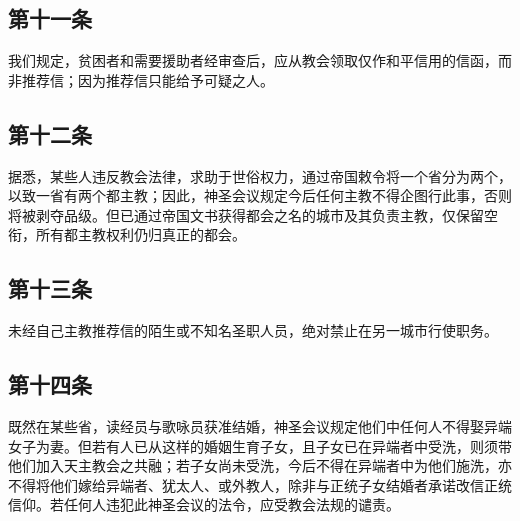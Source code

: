 
\subsection{第十一条}

我们规定，贫困者和需要援助者经审查后，应从教会领取仅作和平信用的信函，而非推荐信；因为推荐信只能给予可疑之人。\par


\subsection{第十二条}

据悉，某些人违反教会法律，求助于世俗权力，通过帝国敕令将一个省分为两个，以致一省有两个都主教；因此，神圣会议规定今后任何主教不得企图行此事，否则将被剥夺品级。但已通过帝国文书获得都会之名的城市及其负责主教，仅保留空衔，所有都主教权利仍归真正的都会。\par


\subsection{第十三条}

未经自己主教推荐信的陌生或不知名圣职人员，绝对禁止在另一城市行使职务。\par


\subsection{第十四条}

既然在某些省，读经员与歌咏员获准结婚，神圣会议规定他们中任何人不得娶异端女子为妻。但若有人已从这样的婚姻生育子女，且子女已在异端者中受洗，则须带他们加入天主教会之共融；若子女尚未受洗，今后不得在异端者中为他们施洗，亦不得将他们嫁给异端者、犹太人、或外教人，除非与正统子女结婚者承诺改信正统信仰。若任何人违犯此神圣会议的法令，应受教会法规的谴责。\par


